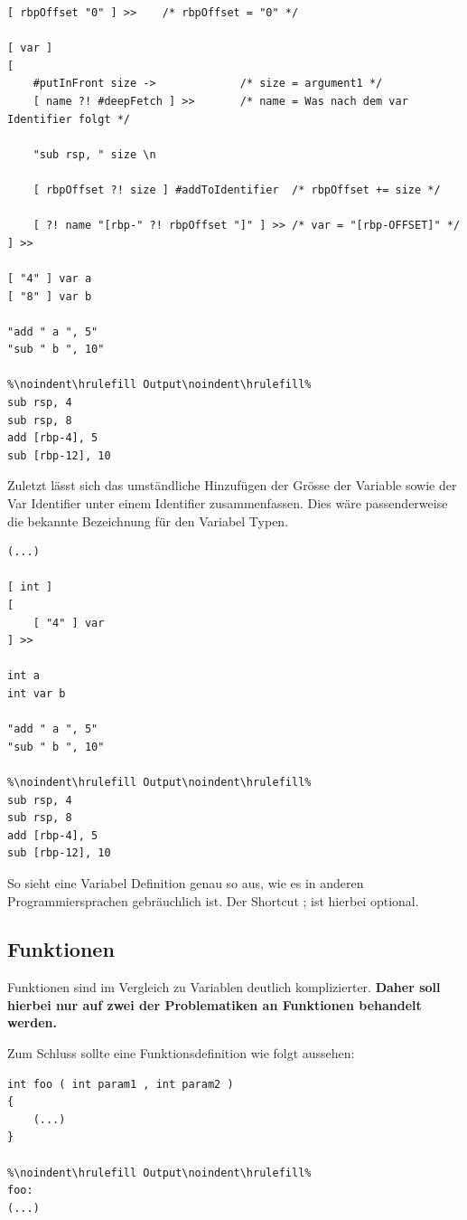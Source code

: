\begin{lstlisting}[language=QHS, caption=Definition einer Variable mit rbpOffset]
[ rbpOffset "0" ] >>    /* rbpOffset = "0" */

[ var ]
[
    #putInFront size ->             /* size = argument1 */
    [ name ?! #deepFetch ] >>       /* name = Was nach dem var Identifier folgt */

    "sub rsp, " size \n

    [ rbpOffset ?! size ] #addToIdentifier  /* rbpOffset += size */

    [ ?! name "[rbp-" ?! rbpOffset "]" ] >> /* var = "[rbp-OFFSET]" */
] >> 

[ "4" ] var a 
[ "8" ] var b 

"add " a ", 5"
"sub " b ", 10"
    
%\noindent\hrulefill Output\noindent\hrulefill%
sub rsp, 4
sub rsp, 8
add [rbp-4], 5
sub [rbp-12], 10
\end{lstlisting}

Zuletzt lässt sich das umständliche Hinzufügen der Grösse der Variable sowie der Var Identifier unter einem Identifier zusammenfassen. Dies wäre passenderweise die bekannte Bezeichnung für den Variabel Typen.

\begin{lstlisting}[language=QHS, caption=Definition einer Variable mit int Identifier]
(...)

[ int ] 
[
    [ "4" ] var
] >>
    
int a 
int var b 
    
"add " a ", 5"
"sub " b ", 10"
        
%\noindent\hrulefill Output\noindent\hrulefill%
sub rsp, 4
sub rsp, 8
add [rbp-4], 5
sub [rbp-12], 10
\end{lstlisting}

So sieht eine Variabel Definition genau so aus, wie es in anderen Programmiersprachen gebräuchlich ist. Der Shortcut ; ist hierbei optional.

\subsection{Funktionen} \label{sec:qhs-funcs}
Funktionen sind im Vergleich zu Variablen deutlich komplizierter. \textbf{Daher soll hierbei nur auf zwei der Problematiken an Funktionen behandelt werden.}

Zum Schluss sollte eine Funktionsdefinition wie folgt aussehen:


\begin{lstlisting}[language=QHS, label=eg:qhs-function_goal, caption=Ziel für die Definition einer Funktion in QHS]
int foo ( int param1 , int param2 )
{
    (...)
}
            
%\noindent\hrulefill Output\noindent\hrulefill%
foo:
(...)
\end{lstlisting}

